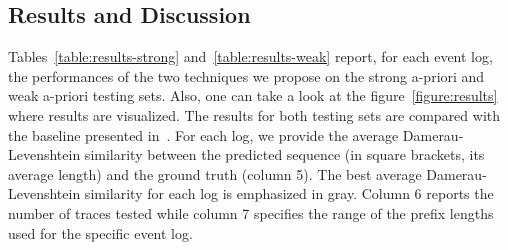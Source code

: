 \subsection{Results and Discussion}
\label{ssec:results}

Tables~\ref{table:results-strong} and~\ref{table:results-weak} report, for each event log, the performances of the two techniques we propose on the strong a-priori and weak a-priori testing sets. Also, one can take a look at the figure~\ref{figure:results} where results are visualized. The results for both testing sets are compared with the baseline presented in~\cite{niek96732}. For each log, we provide the average Damerau-Levenshtein similarity between the predicted sequence (in square brackets, its average length) and the ground truth (column 5). The best average Damerau-Levenshtein similarity for each log is emphasized in gray. Column 6 reports the number of traces tested while column 7 specifies the range of the prefix lengths used for the specific event log. %

\newcommand{\maxf}[1]{{\cellcolor[gray]{0.8}} #1}

